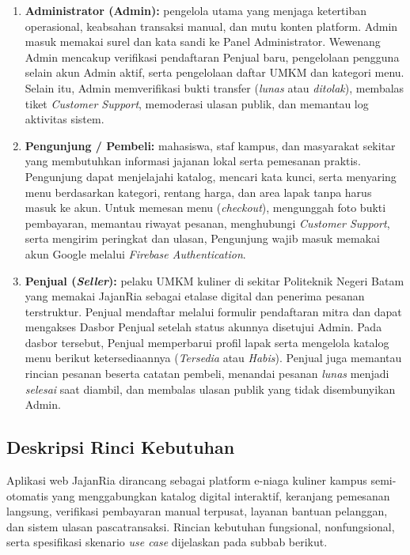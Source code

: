\begin{enumerate}[leftmargin=1.5em, itemsep=4pt, topsep=2pt]
  \item \textbf{Administrator (Admin):} pengelola utama yang menjaga ketertiban operasional, keabsahan transaksi manual, dan mutu konten platform. Admin masuk memakai surel dan kata sandi ke Panel Administrator. Wewenang Admin mencakup verifikasi pendaftaran Penjual baru, pengelolaan pengguna selain akun Admin aktif, serta pengelolaan daftar UMKM dan kategori menu. Selain itu, Admin memverifikasi bukti transfer (\textit{lunas} atau \textit{ditolak}), membalas tiket \textit{Customer Support}, memoderasi ulasan publik, dan memantau log aktivitas sistem.

  \item \textbf{Pengunjung / Pembeli:} mahasiswa, staf kampus, dan masyarakat sekitar yang membutuhkan informasi jajanan lokal serta pemesanan praktis. Pengunjung dapat menjelajahi katalog, mencari kata kunci, serta menyaring menu berdasarkan kategori, rentang harga, dan area lapak tanpa harus masuk ke akun. Untuk memesan menu (\textit{checkout}), mengunggah foto bukti pembayaran, memantau riwayat pesanan, menghubungi \textit{Customer Support}, serta mengirim peringkat dan ulasan, Pengunjung wajib masuk memakai akun Google melalui \textit{Firebase Authentication}.

  \item \textbf{Penjual (\textit{Seller}):} pelaku UMKM kuliner di sekitar Politeknik Negeri Batam yang memakai JajanRia sebagai etalase digital dan penerima pesanan terstruktur. Penjual mendaftar melalui formulir pendaftaran mitra dan dapat mengakses Dasbor Penjual setelah status akunnya disetujui Admin. Pada dasbor tersebut, Penjual memperbarui profil lapak serta mengelola katalog menu berikut ketersediaannya (\textit{Tersedia} atau \textit{Habis}). Penjual juga memantau rincian pesanan beserta catatan pembeli, menandai pesanan \textit{lunas} menjadi \textit{selesai} saat diambil, dan membalas ulasan publik yang tidak disembunyikan Admin.
\end{enumerate}

\subsection{Deskripsi Rinci Kebutuhan}

Aplikasi web JajanRia dirancang sebagai platform e-niaga kuliner kampus semi-otomatis yang menggabungkan katalog digital interaktif, keranjang pemesanan langsung, verifikasi pembayaran manual terpusat, layanan bantuan pelanggan, dan sistem ulasan pascatransaksi. Rincian kebutuhan fungsional, nonfungsional, serta spesifikasi skenario \textit{use case} dijelaskan pada subbab berikut.

